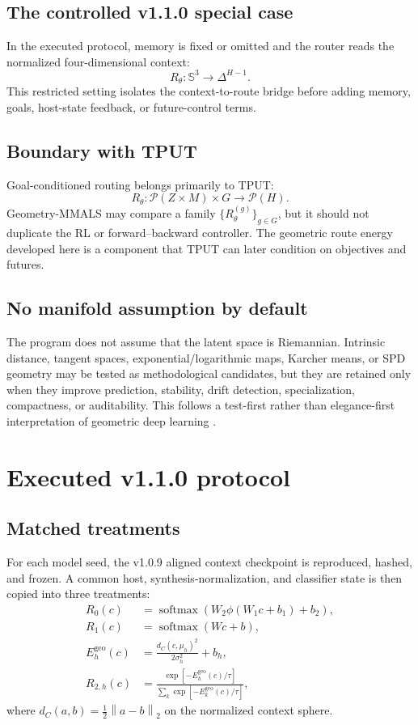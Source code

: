 \documentclass[11pt,a4paper]{article}
\newcommand{\Pcal}{\mathcal{P}}
\newcommand{\norm}[1]{\left\lVert #1 \right\rVert}
\newcommand{\softmax}{\operatorname{softmax}}
\begin{document}
\subsection{The controlled v1.1.0 special case}
In the executed protocol, memory is fixed or omitted and the router reads the normalized four-dimensional context:
\begin{equation}
R_\theta:\mathbb S^3\longrightarrow\Delta^{H-1}.
\end{equation}
This restricted setting isolates the context-to-route bridge before adding memory, goals, host-state feedback, or future-control terms.

\subsection{Boundary with TPUT}
Goal-conditioned routing belongs primarily to TPUT:
\begin{equation}
R_\theta:\Pcal(Z\times M)\times G\longrightarrow\Pcal(H).
\end{equation}
Geometry-MMALS may compare a family $\{R_\theta^{(g)}\}_{g\in G}$, but it should not duplicate the RL or forward--backward controller. The geometric route energy developed here is a component that TPUT can later condition on objectives and futures.

\subsection{No manifold assumption by default}
The program does not assume that the latent space is Riemannian. Intrinsic distance, tangent spaces, exponential/logarithmic maps, Karcher means, or SPD geometry may be tested as methodological candidates, but they are retained only when they improve prediction, stability, drift detection, specialization, compactness, or auditability. This follows a test-first rather than elegance-first interpretation of geometric deep learning \cite{bronstein2021geometric,amari1998natural}.

\section{Executed v1.1.0 protocol}
\subsection{Matched treatments}
For each model seed, the v1.0.9 aligned context checkpoint is reproduced, hashed, and frozen. A common host, synthesis-normalization, and classifier state is then copied into three treatments:
\begin{align}
R_0(c)&=\softmax\!\left(W_2\phi(W_1c+b_1)+b_2\right),\\
R_1(c)&=\softmax(Wc+b),\\
E_h^{\mathrm{geo}}(c)&=\frac{d_C(c,\mu_h)^2}{2\sigma_h^2}+b_h,\\
R_{2,h}(c)&=\frac{\exp[-E_h^{\mathrm{geo}}(c)/\tau]}{\sum_k\exp[-E_k^{\mathrm{geo}}(c)/\tau]},
\end{align}
where $d_C(a,b)=\tfrac12\norm{a-b}_2$ on the normalized context sphere.
\end{document}
